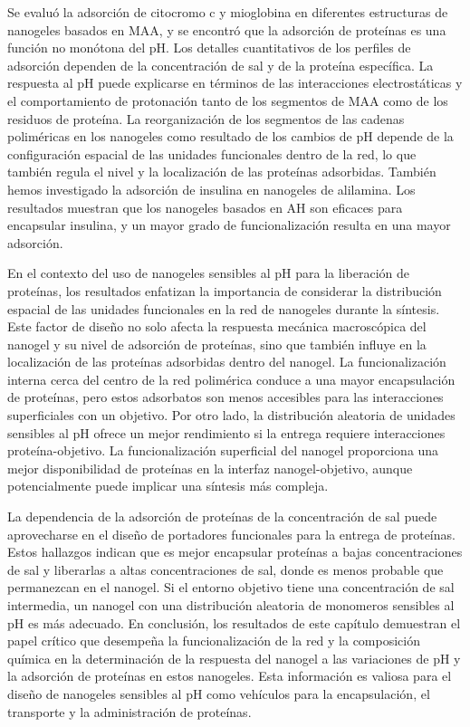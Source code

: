 Se evalu\'o la adsorci\'on de citocromo c y mioglobina en diferentes estructuras de nanogeles basados en MAA, y se encontr\'o que la adsorci\'on de prote\'inas es una funci\'on no mon\'otona del pH.
Los detalles cuantitativos de los perfiles de adsorci\'on dependen de la concentraci\'on de sal y de la prote\'ina espec\'ifica.
La respuesta al pH puede explicarse en t\'erminos de las interacciones electrost\'aticas y el comportamiento de protonaci\'on tanto de los segmentos de MAA como de los residuos de prote\'ina.
La reorganizaci\'on de los segmentos de las cadenas polim\'ericas en los nanogeles como resultado de los cambios de pH depende de la configuraci\'on espacial de las unidades funcionales dentro de la red, lo que tambi\'en regula el nivel y la localizaci\'on de las prote\'inas adsorbidas.
Tambi\'en hemos investigado la adsorci\'on de insulina en nanogeles de alilamina.
Los  resultados muestran que los nanogeles basados en AH son eficaces para encapsular insulina, y un mayor grado de funcionalizaci\'on resulta en una mayor adsorci\'on.

En el contexto del uso de nanogeles sensibles al pH para la liberaci\'on de prote\'inas, los resultados enfatizan la importancia de considerar la distribuci\'on espacial de las unidades funcionales en la red de nanogeles durante la s\'intesis.
Este factor de dise\~no no solo afecta la respuesta mec\'anica macrosc\'opica del nanogel y su nivel de adsorci\'on de prote\'inas, sino que tambi\'en influye en la localizaci\'on de las prote\'inas adsorbidas dentro del nanogel.
La funcionalizaci\'on interna cerca del centro de la red polim\'erica conduce a una mayor encapsulaci\'on de prote\'inas, pero estos adsorbatos son menos accesibles para las interacciones superficiales con un objetivo.
Por otro lado, la distribuci\'on aleatoria de unidades sensibles al pH ofrece un mejor rendimiento si la entrega requiere interacciones prote\'ina-objetivo.
La funcionalizaci\'on superficial del nanogel proporciona una mejor disponibilidad de proteínas en la interfaz nanogel-objetivo, aunque potencialmente puede implicar una s\'intesis m\'as compleja.

La dependencia de la adsorci\'on de prote\'inas de la concentraci\'on de sal puede aprovecharse en el dise\~no de portadores funcionales para la entrega de prote\'inas.
Estos hallazgos indican que es mejor encapsular prote\'inas a bajas concentraciones de sal y liberarlas a altas concentraciones de sal, donde es menos probable que permanezcan en el nanogel.
Si el entorno objetivo tiene una concentraci\'on de sal intermedia, un nanogel con una distribuci\'on aleatoria de monomeros sensibles al pH es m\'as adecuado.
En conclusi\'on, los resultados de este cap\'itulo demuestran el papel cr\'itico que desempe\~na la funcionalizaci\'on de la red y la composici\'on qu\'imica en la determinaci\'on de la respuesta del nanogel a las variaciones de pH y la adsorci\'on de prote\'inas en estos nanogeles.
Esta informaci\'on es valiosa para el dise\~no de nanogeles sensibles al pH como veh\'iculos para la encapsulaci\'on, el transporte y la administraci\'on de prote\'inas.


